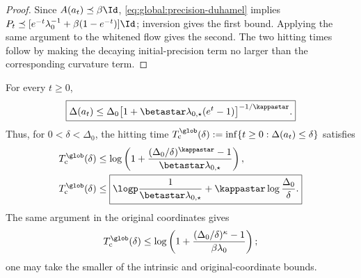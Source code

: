 \begin{proof}
Since \(A(a_t)\preceq\beta\Id\), \eqref{eq:global:precision-duhamel} implies
\(
P_t\preceq[e^{-t}\lambda_0^{-1}+\beta(1-e^{-t})]\Id
\); inversion gives the first bound.  Applying the same argument to the whitened flow gives the
second.  The two hitting times follow by making the decaying initial-precision term no larger than
the corresponding curvature term.
\end{proof}

\begin{theorem}
\label{thm:global:continuous-upper}
For every \(t\geq0\),
\begin{equation}
\label{eq:global:continuous-decay}
    \boxed{
    \Delta(a_t)
    \leq
    \Delta_0
    \bigl[1+\betastar\lambda_{0,\star}(e^t-1)\bigr]^{-1/\kappastar}.}
\end{equation}
Thus, for \(0<\delta<\Delta_0\), the hitting time
\(
T_{\mathrm c}^{\glob}(\delta)
:=\inf\{t\geq0:\Delta(a_t)\leq\delta\}
\) satisfies
\begin{align}
\label{eq:global:continuous-hitting-exact}
    T_{\mathrm c}^{\glob}(\delta)
    &\leq
    \log\left(
        1+
        \frac{(\Delta_0/\delta)^{\kappastar}-1}
             {\betastar\lambda_{0,\star}}
    \right),\\
\label{eq:global:continuous-hitting-split}
    T_{\mathrm c}^{\glob}(\delta)
    &\leq
    \boxed{
    \logp\frac1{\betastar\lambda_{0,\star}}
    +\kappastar\log\frac{\Delta_0}{\delta}.}
\end{align}
The same argument in the original coordinates gives
\begin{equation}
\label{eq:global:continuous-hitting-original}
    T_{\mathrm c}^{\glob}(\delta)
    \leq
    \log\left(
        1+\frac{(\Delta_0/\delta)^\kappa-1}{\beta\lambda_0}
    \right);
\end{equation}
one may take the smaller of the intrinsic and original-coordinate bounds.
\end{theorem}

